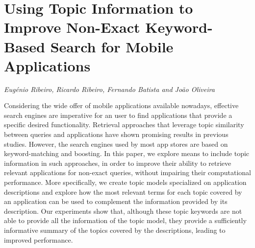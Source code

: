 \documentclass[../booklet.tex]{subfiles}
\begin{document}
\section[Using Topic Information to Improve Non-Exact Keyword-Based Search for Mobile Applications. {\it Eugénio Ribeiro, Ricardo Ribeiro, Fernando Batista and João Oliveira}]{Using Topic Information to Improve Non-Exact Keyword-Based Search for Mobile Applications}
   

\begin{center}
  {\it Eugénio Ribeiro, Ricardo Ribeiro, Fernando Batista and João Oliveira}
\end{center}

\vskip 0.8cm


Considering the wide offer of mobile applications available nowadays, effective search engines are imperative for an user to find applications that provide a specific desired functionality. Retrieval approaches that leverage topic similarity between queries and applications have shown promising results in previous studies. However, the search engines used by most app stores are based on keyword-matching and boosting. In this paper, we explore means to include topic information in such approaches, in order to improve their ability to retrieve relevant applications for non-exact queries, without impairing their computational performance. More specifically, we create topic models specialized on application descriptions and explore how the most relevant terms for each topic covered by an application can be used to complement the information provided by its description. Our experiments show that, although these topic keywords are not able to provide all the information of the topic model, they provide a sufficiently informative summary of the topics covered by the descriptions, leading to improved performance.

\end{document}
